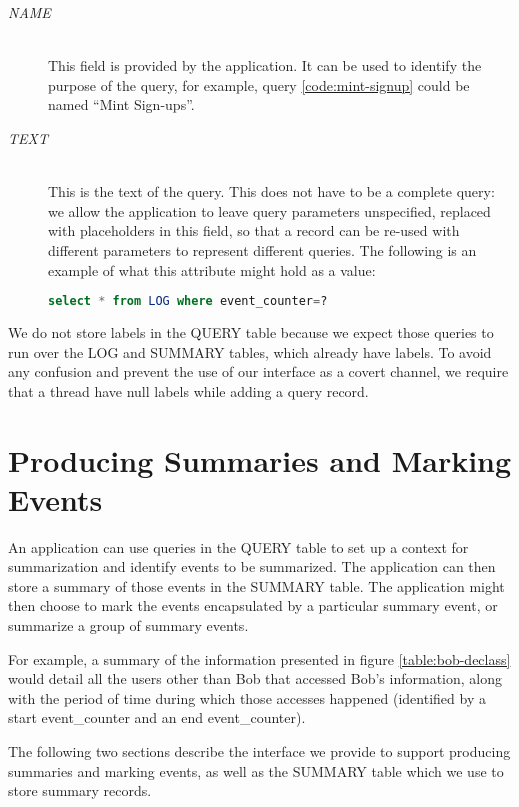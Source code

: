 \begin{description}
  \item[\emph{NAME}] \ \\
    This field is provided by the application. It
    can be used to identify the purpose of the query,
    for example, query \ref{code:mint-signup}
    could be named ``Mint Sign-ups''.
  \item[\emph{TEXT}] \ \\
    This is the text of the query. This does
    not have to be a complete query: we allow the
    application to leave query parameters unspecified,
    replaced with placeholders in this field,
    so that a record can be re-used with different
    parameters to represent different queries.
    The following is an example of what this
    attribute might hold as a value:

\begin{lstlisting}[language=SQL, deletendkeywords={TIMESTAMP}]
select * from LOG where event_counter=?
\end{lstlisting}

\end{description}

\noindent
We do not store labels in the QUERY table because we expect those queries to run over the LOG and SUMMARY tables, which already have labels. To avoid any confusion and prevent the use of our interface as a covert channel, we require that a thread have null labels while adding a query record.

\section{Producing Summaries and Marking Events}
\label{model:summaries}
An application can use queries in the QUERY table to set up a context for summarization and identify events to be summarized. The application can then store a summary of those events in the SUMMARY table. The application might then choose to mark the events encapsulated by a particular summary event, or summarize a group of summary events.

For example, a summary of the information presented in figure \ref{table:bob-declass} would detail all the users other than Bob that accessed Bob's information, along with the period of time during which those accesses happened (identified by a start event\_counter and an end event\_counter).

The following two sections describe the interface we provide to support producing summaries and marking events, as well as the SUMMARY table which we use to store summary records.

